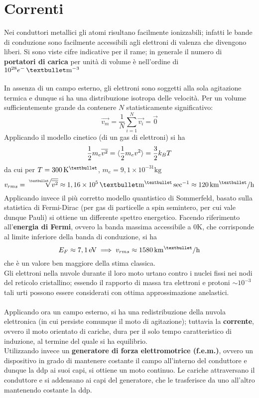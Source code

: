 \section{Correnti}
Nei conduttori metallici gli atomi risultano facilmente ionizzabili; infatti le bande di conduzione sono facilmente accessibili agli elettroni di valenza che divengono liberi. Si sono viste cifre indicative per il rame; in generale il numero di \textbf{portatori di carica} per unità di volume è nell'ordine di $10^{28} e^- \meters{•}{-3}$
\\~\\
In assenza di un campo esterno, gli elettroni sono soggetti alla sola agitazione termica e dunque si ha una distribuzione isotropa delle velocità. Per un volume sufficientemente grande da contenere $N$ statisticamente significativo:
\[\vec{v_m} = \frac{1}{N} \sum\limits_{i=1}^{N} \vec{v_i} = \vec{0}\]
Applicando il modello cinetico (di un gas di elettroni) si ha
\[\frac{1}{2} m_e \overline{v^2} = \langle \frac{1}{2} m_e v^2 \rangle = \frac{3}{2} k_B T\]
da cui per $T = 300 \kelvin{•}$, $m_e = 9,1 \times 10^{-31} \mathrm{kg}$
\[v_{rms} = \sqrt[•]{\overline{v^2}} \approx 1,16 \times 10^{5} \meters{•}{•}\sec^{-1} \approx 120 \meters{k}{•}/\mathrm{h}\]
Applicando invece il più corretto modello quantistico di Sommerfeld, basato sulla statistica di Fermi-Dirac (per gas di particelle a spin semintero, per cui vale dunque Pauli) si ottiene un differente spettro energetico. Facendo riferimento all'\textbf{energia di Fermi}, ovvero la banda massima accessibile a 0K, che corrisponde al limite inferiore della banda di conduzione, si ha
\[E_F \approx 7,1 \evolt \implies v_{rms} \approx 1580 \meters{k}{•}/\mathrm{h}\]
che è un valore ben maggiore della stima classica.
\\Gli elettroni nella nuvole durante il loro moto urtano contro i nuclei fissi nei nodi del reticolo cristallino; essendo il rapporto di massa tra elettroni e protoni $\sim 10^{-3}$ tali urti possono essere considerati con ottima approssimazione anelastici.
\\~\\
Applicando ora un campo esterno, si ha una redistribuzione della nuvola elettronica (in cui persiste comunque il moto di agitazione); tuttavia la \textbf{corrente}, ovvero il moto orientato di cariche, dura per il solo tempo caratteristico di induzione, al termine del quale si ha equilibrio.
\\Utilizzando invece un \textbf{generatore di forza elettromotrice (f.e.m.)}, ovvero un dispositivo in grado di mantenere costante il campo all'interno del conduttore e dunque la ddp ai suoi capi, si ottiene un moto continuo. Le cariche attraversano il conduttore e si addensano ai capi del generatore, che le trasferisce da uno all'altro mantenendo costante la ddp.
